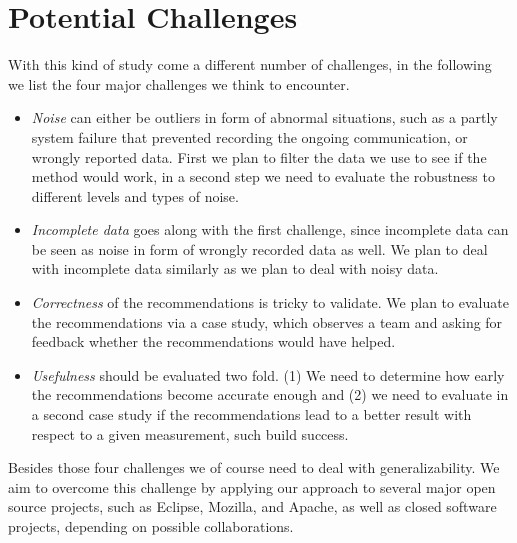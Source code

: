 

\section{Potential Challenges}
With this kind of study come a different number of challenges, in the following we list the four major challenges we think to encounter.
\begin{itemize}
\item \emph{Noise} can either be outliers in form of abnormal situations, such as a partly system failure that prevented recording the ongoing communication, or wrongly reported data.
First we plan to filter the data we use to see if the method would work, in a second step we need to evaluate the robustness to different levels and types of noise.
\item \emph{Incomplete data} goes along with the first challenge, since incomplete data can be seen as noise in form of wrongly recorded data as well.
We plan to deal with incomplete data similarly as we plan to deal with noisy data.
\item \emph{Correctness} of the recommendations is tricky to validate.
We plan to evaluate the recommendations via a case study, which observes a team and asking for feedback whether the recommendations would have helped. 
\item \emph{Usefulness} should be evaluated two fold. (1) We need to determine how early the recommendations become accurate enough and (2) we need to evaluate in a second case study if the recommendations lead to a better result with respect to a given measurement, such build success.
\end{itemize}
Besides those four challenges we of course need to deal with generalizability.
We aim to overcome this challenge by applying our approach to several major open source projects, such as Eclipse, Mozilla, and Apache, as well as closed software projects, depending on possible collaborations.


